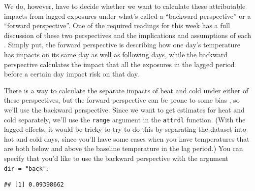 \documentclass[
]{book}
\newenvironment{Shaded}{\begin{snugshade}}{\end{snugshade}}
\newcommand{\AttributeTok}[1]{\textcolor[rgb]{0.77,0.63,0.00}{#1}}
\newcommand{\CommentTok}[1]{\textcolor[rgb]{0.56,0.35,0.01}{\textit{#1}}}
\newcommand{\DecValTok}[1]{\textcolor[rgb]{0.00,0.00,0.81}{#1}}
\newcommand{\FunctionTok}[1]{\textcolor[rgb]{0.00,0.00,0.00}{#1}}
\newcommand{\NormalTok}[1]{#1}
\newcommand{\SpecialCharTok}[1]{\textcolor[rgb]{0.00,0.00,0.00}{#1}}
\newcommand{\StringTok}[1]{\textcolor[rgb]{0.31,0.60,0.02}{#1}}
\begin{document}
We do, however, have to decide whether we want to calculate these attributable impacts from lagged exposures under what's called a ``backward perspective'' or a ``forward perspective''. One of the required readings for this week has a full discussion of these two perspectives and the implications and assumptions of each \citep{gasparrini2014attributable}. Simply put, the forward perspective is describing how one day's temperature has impacts on its same day as well as following days, while the backward perspective calculates the impact that all the exposures in the lagged period before a certain day impact risk on that day.

There is a way to calculate the separate impacts of heat and cold under either of these perspectives, but the forward perspective can be prone to some bias \citep{gasparrini2014attributable}, so we'll use the backward perspective. Since we want to get estimates for heat and cold separately, we'll use the \texttt{range} argument in the \texttt{attrdl} function. (With the lagged effects, it would be tricky to try to do this by separating the dataset into hot and cold days, since you'll have some cases when you have temperatures that are both below and above the baseline temperature in the lag period.) You can specify that you'd like to use the backward perspective with the argument \texttt{dir\ =\ "back"}:

\begin{Shaded}
\end{Shaded}

\begin{verbatim}
## [1] 0.09398662
\end{verbatim}
\end{document}
